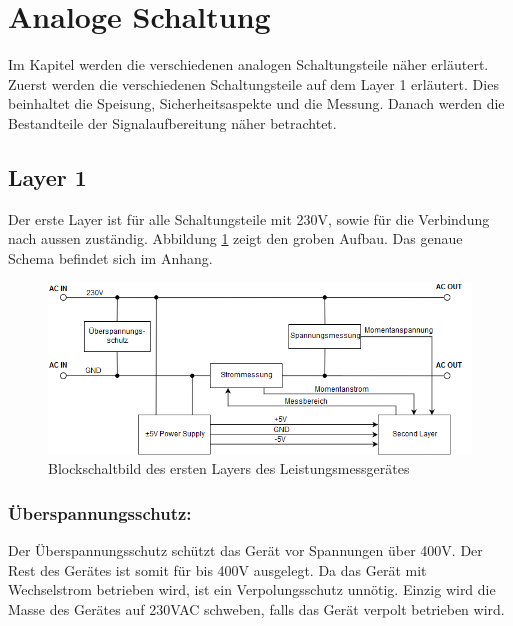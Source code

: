 \section{Analoge Schaltung}\label{sec:analoge_schaltung}
Im Kapitel werden die verschiedenen analogen Schaltungsteile näher erläutert. Zuerst werden die verschiedenen Schaltungsteile auf dem Layer 1 erläutert. Dies beinhaltet die Speisung, Sicherheitsaspekte und die Messung. Danach werden die Bestandteile der Signalaufbereitung näher betrachtet.

\subsection{Layer 1}%
Der erste Layer ist für alle Schaltungsteile mit 230V, sowie für die Verbindung nach aussen zuständig. Abbildung \ref{fig:first_layer} zeigt den groben Aufbau. Das genaue Schema befindet sich im Anhang.

\begin{figure}[H]
\begin{center}
\includegraphics[width=160mm]{images/first_layer.png}

	\caption{Blockschaltbild des ersten Layers des Leistungsmessgerätes} %
	\label{fig:first_layer}
\end{center}
\end{figure}

\subsubsection*{Überspannungsschutz:}
Der Überspannungsschutz schützt das Gerät vor Spannungen über 400V. Der Rest des Gerätes ist somit für bis 400V ausgelegt. Da das Gerät mit Wechselstrom betrieben wird, ist ein Verpolungsschutz unnötig. Einzig wird die Masse des Gerätes auf 230VAC schweben, falls das Gerät verpolt betrieben wird.

